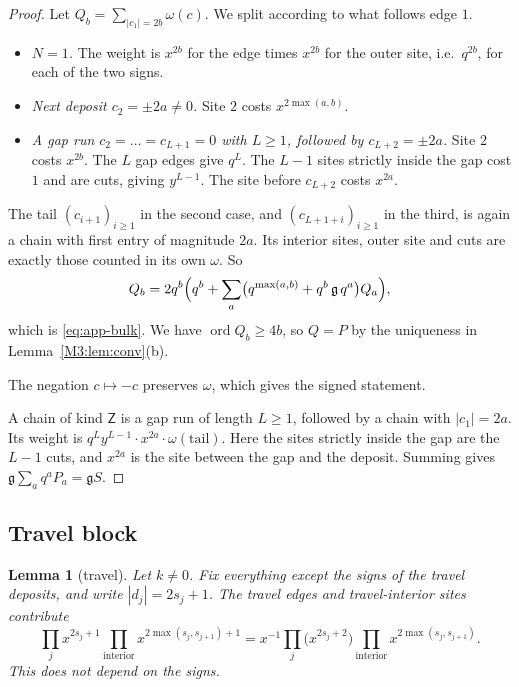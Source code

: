 \documentclass[11pt]{article}
\theoremstyle{plain}
\newtheorem{lemma}[theorem]{Lemma}
\theoremstyle{definition}
\theoremstyle{remark}
\begin{document}
\begin{proof}
Let $Q_b=\sum_{|c_1|=2b}\omega(c)$. We split according to what follows edge $1$.
\begin{itemize}
\item \emph{$N=1$.} The weight is $x^{2b}$ for the edge times $x^{2b}$ for the outer site,
  i.e.\ $q^{2b}$, for each of the two signs.
\item \emph{Next deposit $c_2=\pm2a\ne0$.} Site $2$ costs $x^{2\max(a,b)}$.
\item \emph{A gap run $c_2=\dots=c_{L+1}=0$ with $L\ge1$, followed by $c_{L+2}=\pm2a$.} Site
  $2$ costs $x^{2b}$. The $L$ gap edges give $q^L$. The $L-1$ sites strictly inside the gap
  cost $1$ and are cuts, giving $y^{L-1}$. The site before $c_{L+2}$ costs $x^{2a}$.
\end{itemize}
The tail $(c_{i+1})_{i\ge1}$ in the second case, and $(c_{L+1+i})_{i\ge1}$ in the third, is
again a chain with first entry of magnitude $2a$. Its interior sites, outer site and cuts
are exactly those counted in its own $\omega$. So
\[
  Q_b=2q^b\Bigl(q^b+\sum_{a}\bigl(q^{\max(a,b)}+q^{b}\,\mathfrak g\,q^{a}\bigr)Q_a\Bigr),
\]
which is \eqref{eq:app-bulk}. We have $\operatorname{ord}Q_b\ge4b$, so $Q=P$ by the
uniqueness in Lemma~\ref{M3:lem:conv}(b).

The negation $c\mapsto-c$ preserves $\omega$, which gives the signed statement.

A chain of kind $\mathsf Z$ is a gap run of length $L\ge1$, followed by a chain with
$|c_1|=2a$. Its weight is $q^Ly^{L-1}\cdot x^{2a}\cdot\omega(\text{tail})$. Here the sites
strictly inside the gap are the $L-1$ cuts, and $x^{2a}$ is the site between the gap and the
deposit. Summing gives $\mathfrak g\sum_aq^aP_a=\mathfrak gS$.
\end{proof}

\subsection{Travel block}\label{app:travel}

\begin{lemma}[travel]\label{M3:lem:travel}
Let $k\ne0$. Fix everything except the signs of the travel deposits, and write
$|d_j|=2s_j+1$. The travel edges and travel-interior sites contribute
\[
  \prod_{j}x^{2s_j+1}\prod_{\text{interior}}x^{2\max(s_{j},s_{j+1})+1}
  =x^{-1}\prod_j\bigl(x^{2s_j+2}\bigr)\prod_{\text{interior}}x^{2\max(s_j,s_{j+1})}.
\]
This does not depend on the signs.
\end{lemma}
\end{document}
